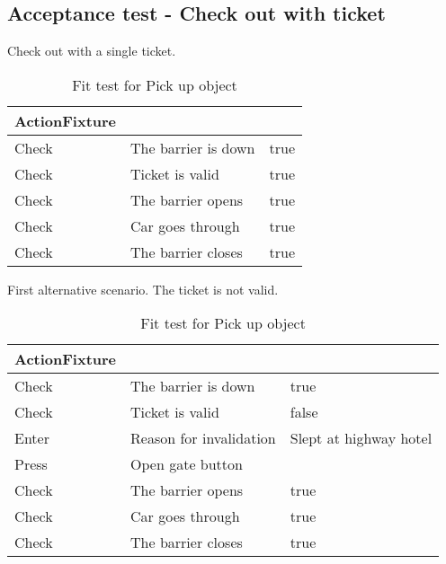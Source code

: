 \subsection{Acceptance test - Check out with ticket}
Check out with a single ticket.

\begin{table}[H]
    \centering
    \begin{tabular}{| l | l | l |}
        \hline
        \textbf{ActionFixture}  &                       & \\\hline
        Check                   & The barrier is down   & true  \\\hline
        Check                   & Ticket is valid       & true  \\\hline
        Check                   & The barrier opens     & true  \\\hline
        Check                   & Car goes through      & true \\\hline
        Check                   & The barrier closes    & true \\\hline
       
    \end{tabular}
    \caption{Fit test for Pick up object}
\end{table}

First alternative scenario. The ticket is not valid.

\begin{table}[H]
    \centering
    \begin{tabular}{| l | l | l |}
        \hline
        \textbf{ActionFixture}  &                           & \\\hline
        Check                   & The barrier is down       & true  \\\hline
        Check                   & Ticket is valid           & false  \\\hline
        Enter                   & Reason for invalidation   & Slept at highway hotel  \\\hline
        Press                   & Open gate button          & \\\hline
        Check                   & The barrier opens         & true  \\\hline
        Check                   & Car goes through          & true \\\hline
        Check                   & The barrier closes        & true \\\hline
       
    \end{tabular}
    \caption{Fit test for Pick up object}
\end{table}